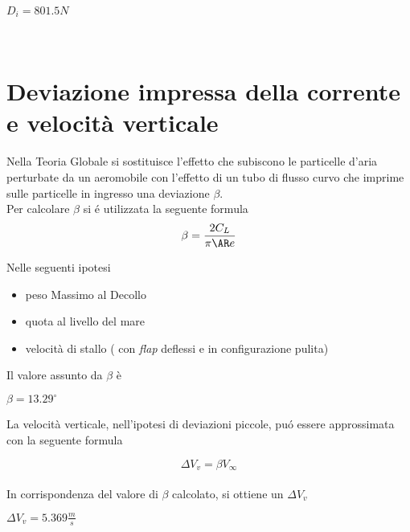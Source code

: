 \begin{center}
$D_{i}= 801.5 N $
\end {center}


\noindent \\ 

\section{ Deviazione impressa della corrente e velocità verticale}

Nella Teoria Globale si sostituisce l'effetto che subiscono le particelle d'aria perturbate da un aeromobile con l'effetto di un tubo di flusso curvo che imprime sulle particelle in ingresso una deviazione ${\beta}$. \\
Per calcolare ${\beta}$ si é utilizzata la seguente formula
\noindent \\

\begin{equation}
\label{eqn:beta}
{\beta}=\frac {2C_L}{{\pi}{\AR}e}
\end{equation}

Nelle seguenti ipotesi 

\begin {itemize}
\item peso Massimo al Decollo
\item quota al livello del mare
\item velocità di stallo ( con {\itshape flap} deflessi e in configurazione pulita)
\end{itemize}

Il valore assunto da ${\beta}$  è 

\begin{center}
${\beta}= 13.29 ^\circ $
\end {center}

La velocità verticale, nell'ipotesi di deviazioni piccole, puó essere approssimata con la seguente formula

\begin{equation}
\label{eqn:velocita}
{\Delta}V_v={\beta}V_{\infty}
\end{equation}
\noindent \\

In corrispondenza del valore di ${\beta}$ calcolato, si ottiene un ${\Delta}V_v$

\begin{center}
${{\Delta}V_v}= 5.369 \frac{m}{s} $
\end {center}

\noindent \\ \\ \\ \\ \\ \\
